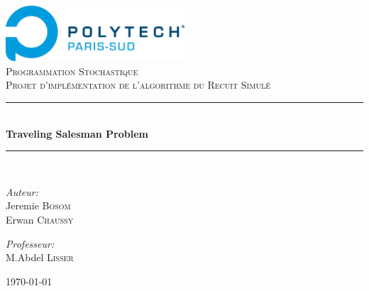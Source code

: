 \newcommand{\HRule}{\rule{\linewidth}{0.5mm}}

\begin{titlepage}
\begin{center}

\includegraphics[width=0.5\textwidth]{polytech}~\\[1cm]

\textsc{\LARGE Programmation Stochastique}\\[1.5cm]

\textsc{\Large Projet d'implémentation de l'algorithme du Recuit Simulé}\\[0.5cm]

\HRule \\[0.4cm]
{ \huge \bfseries Traveling Salesman Problem \\[0.4cm] }
\HRule \\[1.5cm]

\begin{minipage}{0.4\textwidth}
\begin{flushleft} \large
\emph{Auteur:}\\
Jeremie \textsc{Bosom}\\
Erwan \textsc{Chaussy}
\end{flushleft}
\end{minipage}
\begin{minipage}{0.4\textwidth}
\begin{flushright} \large
\emph{Professeur:} \\
M.Abdel \textsc{Lisser}
\end{flushright}
\end{minipage}

\vfill

{\large \today}

\end{center}
\end{titlepage}

